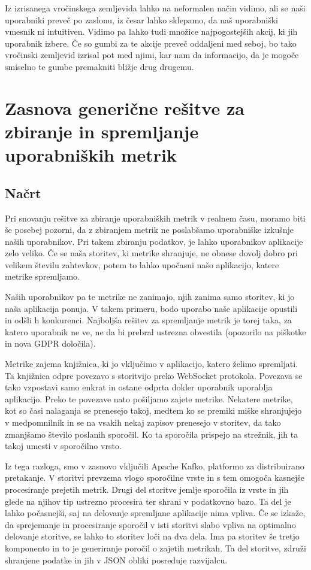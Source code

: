 \documentclass[a4paper, 12pt]{book}
\begin{document}
Iz izrisanega vročinskega zemljevida lahko na neformalen način vidimo, ali se naši uporabniki preveč  po zaslonu, iz česar lahko sklepamo, da naš uporabniški vmesnik ni intuitiven. Vidimo pa lahko tudi množice najpogostejših akcij, ki jih uporabnik izbere. Če so gumbi za te akcije preveč oddaljeni med seboj, bo tako vročinski zemljevid izrisal pot med njimi, kar nam da informacijo, da je mogoče smiselno te gumbe premakniti bližje drug drugemu.

\chapter{Zasnova generične rešitve za zbiranje in spremljanje uporabniških metrik}
\label{ch3}

\section{Načrt}
\label{ch3:sec1}

Pri snovanju rešitve za zbiranje uporabniških metrik v realnem času, moramo biti še posebej pozorni, da z zbiranjem metrik ne poslabšamo uporabniške izkušnje naših uporabnikov. Pri takem zbiranju podatkov, je lahko uporabnikov aplikacije zelo veliko. Če se naša storitev, ki metrike shranjuje, ne obnese dovolj dobro pri velikem številu zahtevkov, potem to lahko upočasni našo aplikacijo, katere metrike spremljamo.

Naših uporabnikov pa te metrike ne zanimajo, njih zanima samo storitev, ki jo naša aplikacija ponuja. V takem primeru, bodo uporabo naše aplikacije opustili in odšli h konkurenci. Najboljša rešitev za spremljanje metrik je torej taka, za katero uporabnik ne ve, ne da bi prebral ustrezna obvestila (opozorilo na piškotke in nova GDPR določila).

Metrike zajema knjižnica, ki jo vključimo v aplikacijo, katero želimo spremljati. Ta knjižnica odpre povezavo s storitvijo preko WebSocket protokola. Povezava se tako vzpostavi samo enkrat in ostane odprta dokler uporabnik uporablja aplikacijo. Preko te povezave nato pošiljamo zajete metrike. Nekatere metrike, kot so časi nalaganja se prenesejo takoj, medtem ko se premiki miške shranjujejo v medpomnilnik in se na vsakih nekaj zapisov prenesejo v storitev, da tako zmanjšamo število poslanih sporočil. Ko ta sporočila prispejo na strežnik, jih ta takoj umesti v sporočilno vrsto.

Iz tega razloga, smo v zasnovo vključili Apache Kafko, platformo za distribuirano pretakanje. V storitvi prevzema vlogo sporočilne vrste in s tem omogoča kasnejše procesiranje prejetih metrik. Drugi del storitve jemlje sporočila iz vrste in jih glede na njihov tip ustrezno procesira ter shrani v podatkovno bazo. Ta del je lahko počasnejši, saj na delovanje spremljane aplikacije nima vpliva. Če se izkaže, da sprejemanje in procesiranje sporočil v isti storitvi slabo vpliva na optimalno delovanje storitve, se lahko to storitev loči na dva dela. Ima pa storitev še tretjo komponento in to je generiranje poročil o zajetih metrikah. Ta del storitve, združi shranjene podatke in jih v JSON obliki posreduje razvijalcu.
\end{document}
